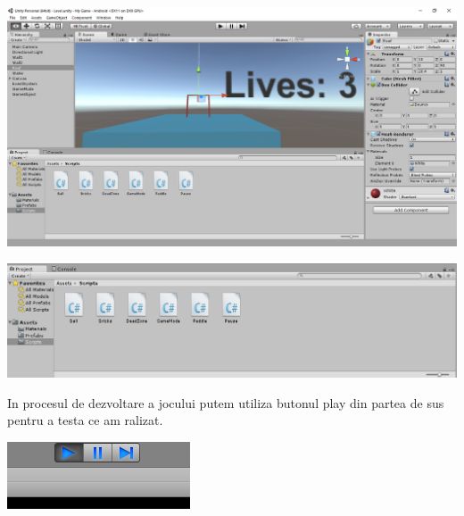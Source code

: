 \begin{center}
\includegraphics[scale=0.5]{images/3}\\
\end{center}
\begin{center}
\includegraphics[scale=0.5]{images/4}\\
\end{center}

In procesul de dezvoltare a jocului putem utiliza butonul play din partea de sus pentru a testa ce am ralizat.\\
\begin{center}
\includegraphics[scale=0.5]{images/5}\\
\end{center}

